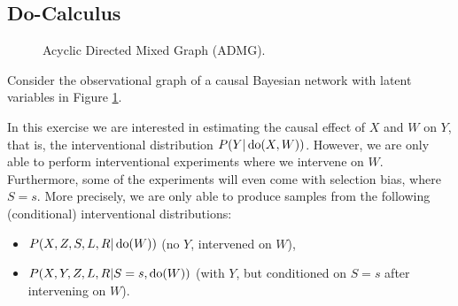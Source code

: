 \subsection{Do-Calculus}

\begin{figure}[ht]
\centering
{}
\caption{Acyclic Directed Mixed Graph (ADMG).}
\label{fig:cadmg-X}
\end{figure}

\noindent Consider the observational graph of a causal Bayesian network with latent variables in Figure \ref{fig:cadmg-X}.

In this exercise we are interested in estimating the causal effect of $X$ and $W$ on $Y$, that is, the interventional distribution $P(Y|\operatorname{do}(X,W))$. 
However, we are only able to perform  interventional experiments where we intervene on $W$. Furthermore, some of the experiments will even come with selection bias, where $S=s$.
More precisely, we are only able to produce samples from the following (conditional) interventional distributions: 
\begin{itemize}
    \item[1.)] $P(X,Z,S,L,R|\operatorname{do}(W))$ (no $Y$, intervened on $W$),
    \item[2.)] $P(X,Y,Z,L,R|S=s,\operatorname{do}(W))$ (with $Y$, but conditioned on $S=s$ after intervening on $W$).
\end{itemize}

